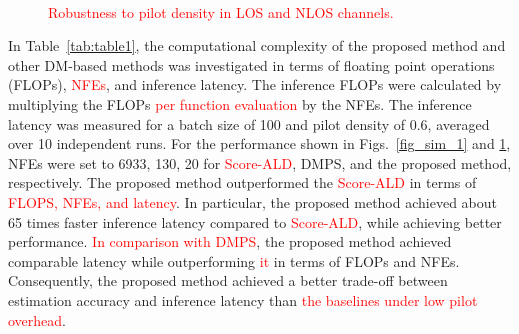 \documentclass[lettersize,journal]{IEEEtran}
\newcommand{\tred}{\textcolor{red}}
\begin{document}
\begin{figure}[!t]
\\
\caption{\tred{Robustness to pilot density in LOS and NLOS channels.}}
\label{fig_sim_2}
\end{figure}

In Table~\ref{tab:table1}, the computational complexity of the proposed method and other DM-based methods was investigated in terms of floating point operations (FLOPs), \tred{NFEs}, and inference latency. The inference FLOPs were calculated by multiplying the FLOPs \tred{per function evaluation} by the NFEs. The inference latency was measured for a batch size of 100 and pilot density of 0.6, averaged over 10 independent runs. For the performance shown in Figs.~\ref{fig_sim_1} and \ref{fig_sim_2}, NFEs were set to 6933, 130, 20 for \tred{Score-ALD}, DMPS, and the proposed method, respectively. The proposed method outperformed the \tred{Score-ALD} in terms of \tred{FLOPS, NFEs, and latency}. In particular, the proposed method achieved about 65 times faster inference latency compared to \tred{Score-ALD}, while achieving better performance. \tred{In comparison with DMPS}, the proposed method achieved comparable latency while outperforming \tred{it} in terms of FLOPs and NFEs. Consequently, the proposed method achieved a better trade-off between estimation accuracy and inference latency than \tred{the baselines under low pilot overhead}.
\end{document}
